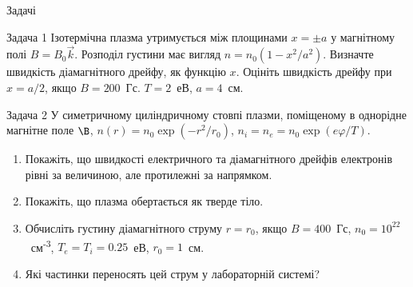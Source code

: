 \documentclass[]{beamer}
\begin{document}
\begin{frame}{Задачі}{}
	\begin{exampleblock}{Задача 1}\justifying%
		Ізотермічна плазма утримується між площинами $x = \pm a $ у магнітному полі $B = B_0 \vec{k} $. Розподіл густини має вигляд $n = n_0\left(1 - x^2/a^2\right)$. Визначте швидкість діамагнітного дрейфу, як функцію $x$. Оцініть швидкість дрейфу при $x = a/2$, якщо $B = 200$~Гс. $T = 2$~еВ, $a = 4$~см.
	\end{exampleblock}
	\begin{exampleblock}{Задача 2}\justifying%
		У симетричному циліндричному стовпі плазми, поміщеному в однорідне магнітне поле $\B$, $n(r) = n_0\exp(-r^2/r_0)$, $n_i = n_e = n_0\exp(e\varphi/T)$.
		\begin{enumerate}
			\item Покажіть, що швидкості електричного та діамагнітного дрейфів електронів рівні за величиною, але протилежні за напрямком.
			\item Покажіть, що плазма обертається як тверде тіло.
			\item Обчисліть густину діамагнітного струму  $r = r_0$, якщо $B = 400$~Гс, $n_0 = 10^{22}$~см\textsuperscript{-3}, $T_e = T_i = 0.25$~еВ, $r_0 = 1$~см.
			\item Які частинки переносять цей струм у лабораторній системі?
		\end{enumerate}
	\end{exampleblock}
\end{frame}
\end{document}

